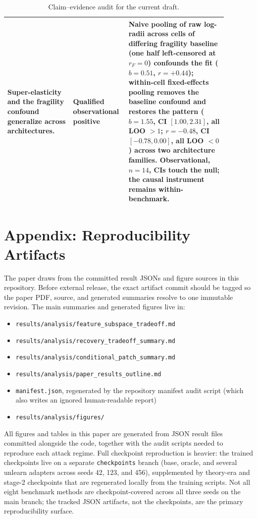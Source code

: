 \documentclass[11pt]{article}
\begin{document}
\begin{table}[t]
\begin{tabular}{p{0.28\linewidth} p{0.18\linewidth} p{0.42\linewidth}}
    Super-elasticity and the fragility confound generalize across architectures. & Qualified observational positive & Naive pooling of raw log-radii across cells of differing fragility baseline (one half left-censored at $r_F{=}0$) confounds the fit ($b{=}0.51$, $r{=}{+}0.44$); within-cell fixed-effects pooling removes the baseline confound and restores the pattern ($b{=}1.55$, CI $[1.00,2.31]$, all LOO $>1$; $r{=}{-}0.48$, CI $[-0.78,0.00]$, all LOO $<0$) across two architecture families. Observational, $n{=}14$, CIs touch the null; the causal instrument remains within-benchmark. \\
    \bottomrule
  \end{tabular}
  \caption{Claim--evidence audit for the current draft.}
  \label{tab:claim-evidence}
\end{table}

\section{Appendix: Reproducibility Artifacts}
The paper draws from the committed result JSONs and figure sources in this repository. Before external release, the exact artifact commit should be tagged so the paper PDF, source, and generated summaries resolve to one immutable revision. The main summaries and generated figures live in:
\begin{itemize}[leftmargin=1.5em]
  \item \texttt{results/analysis/feature\_subspace\_tradeoff.md}
  \item \texttt{results/analysis/recovery\_tradeoff\_summary.md}
  \item \texttt{results/analysis/conditional\_patch\_summary.md}
  \item \texttt{results/analysis/paper\_results\_outline.md}
  \item \texttt{manifest.json}, regenerated by the repository manifest audit script (which also writes an ignored human-readable report)
  \item \texttt{results/analysis/figures/}
\end{itemize}

All figures and tables in this paper are generated from JSON result files committed alongside the code, together with the audit scripts needed to reproduce each attack regime. Full checkpoint reproduction is heavier: the trained checkpoints live on a separate \texttt{checkpoints} branch (base, oracle, and several unlearn adapters across seeds 42, 123, and 456), supplemented by theory-era and stage-2 checkpoints that are regenerated locally from the training scripts. Not all eight benchmark methods are checkpoint-covered across all three seeds on the main branch; the tracked JSON artifacts, not the checkpoints, are the primary reproducibility surface.
\end{document}
